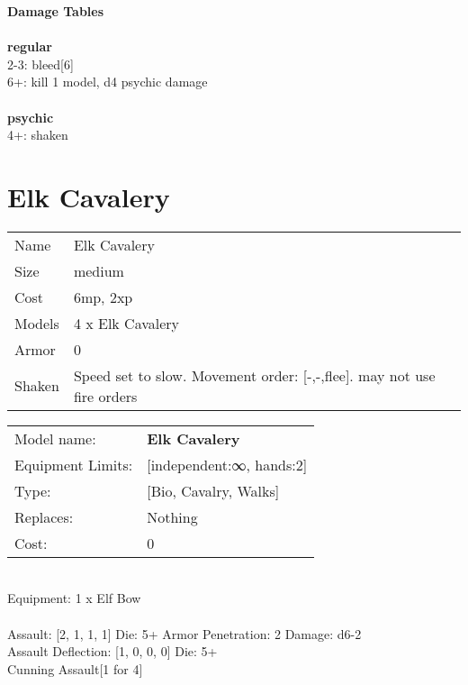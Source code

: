 {\bf Damage Tables} \\
\ \\ {\bf regular } \\
2-3: bleed[6] \\
6+: kill 1 model, d4 psychic damage \\
\ \\ {\bf psychic } \\
4+: shaken \\










\pagebreak\pagebreak

\section{ Elk Cavalery }

\begin{tabular}{ll}
  Name & Elk Cavalery \\
  Size & medium\\
  Cost & 6mp, 2xp\\
  Models & 4 x Elk Cavalery\\
  Armor & 0\\
  Shaken & Speed set to slow. Movement order: [-,-,flee]. may not use fire orders\\
\end{tabular}

\noindent 

\noindent
\begin{tabular}{ll}
Model name: &{\bf Elk Cavalery } \\
Equipment Limits: &[independent:∞, hands:2] \\
Type: &[Bio, Cavalry, Walks] \\
Replaces: &Nothing \\
Cost: & 0\\
\end{tabular}
\ \\
Equipment: 1 x Elf Bow \\
\ \\
Assault: [2, 1, 1, 1] Die: 5+ Armor Penetration: 2 Damage: d6-2 \\
Assault Deflection: [1, 0, 0, 0] Die: 5+\\
\indent Cunning Assault[1 for 4]\\ 
 
\ \\

